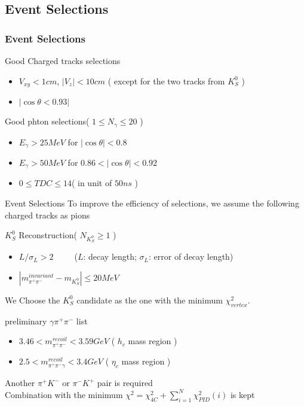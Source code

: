 \documentclass{beamer}
\begin{document}
\subsection{Event Selections}
\begin{frame}
    \frametitle{Event Selections}
    \begin{block}{Good Charged tracks selections}
        \begin{itemize}
            \item $V_{xy} < 1 cm$, $ | V_z | < 10 cm$ ( except for the two tracks from $K_S^0$ )
            \item $|\cos\theta < 0.93 |$
        \end{itemize}
    \end{block}
    \begin{block}{Good phton selections( $1\leq N_{\gamma}\leq 20$ )}
        \begin{itemize}
            \item $E_{\gamma} > 25 MeV$ for $|\cos\theta| < 0.8$
            \item $E_{\gamma} > 50 MeV$ for $0.86<|\cos\theta|<0.92$
            \item $0\leq TDC\leq 14 $( in unit of $50ns$ )
        \end{itemize}
    \end{block}
    \bigskip
\end{frame}

\begin{frame}{Event Selections}
    To improve the efficiency of selections, we assume the following charged tracks as pions
    \begin{block}{$K^0_S$ Reconstruction( $N_{K^0_S} \geq 1$ )}
        \begin{itemize}
            \item $L/\sigma_L > 2 $~~~~~($L$: decay length; $\sigma_L$: error of decay length)
            \item $|m^{invariant}_{\pi^+\pi^-} - m_{K^0_S} | \leq 20 MeV$
        \end{itemize}
        We Choose the $K_S^0$ candidate as the one with the minimum $\chi^2_{vertex}$.
    \end{block}
    \begin{block}{preliminary $\gamma\pi^+\pi^-$ list}
        \begin{itemize}
            \item $3.46<m_{\pi^+\pi^-}^{recoil}<3.59 GeV$ ( $h_c$ mass region )
            \item $2.5<m_{\pi^+\pi^-\gamma}^{recoil}<3.4 GeV$ ( $\eta_c$ mass region )
        \end{itemize}
    \end{block}
    Another $\pi^+K^-$ or $\pi^-K^+$ pair is required\\
    Combination with the minimum $\chi^2 = \chi^2_{4C} + \sum^N_{i=1}\chi^2_{PID}(i)$ is kept 
\end{frame}
\end{document}
